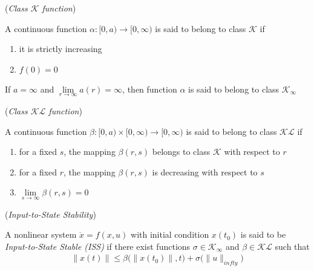 \begin{bw_box}
\begin{definition}\cite{khalil_nonlinear_systems} (\textit{Class $\mathcal{K}$ function})

  A continuous function $\alpha : [0, a) \to [0, \infty)$
  is said to belong to class $\mathcal{K}$ if
  \begin{enumerate}
    \item it is strictly increasing
    \item $f(0) = 0$
  \end{enumerate}
  If $a = \infty$ and $\lim\limits_{r \to \infty} a(r) = \infty$, then function
  $\alpha$ is said to belong to class $\mathcal{K}_{\infty}$
  \label{def:k_class}
\end{definition}
\end{bw_box}

\begin{bw_box}
\begin{definition}\cite{khalil_nonlinear_systems} (\textit{Class $\mathcal{KL}$ function})

  A continuous function $\beta : [0, a) \times [0, \infty) \to [0, \infty)$
  is said to belong to class $\mathcal{KL}$ if
  \begin{enumerate}
    \item for a fixed $s$, the mapping $\beta(r,s)$ belongs to class $\mathcal{K}$ with respect to $r$
    \item for a fixed $r$, the mapping $\beta(r,s)$ is decreasing with respect
      to $s$
    \item $\lim\limits_{s \to \infty} \beta(r,s) = 0$
  \end{enumerate}
  \label{def:kl_class}
\end{definition}
\end{bw_box}


\begin{bw_box}
\begin{definition}\cite{Sontag2008} (\textit{Input-to-State Stability})

  A nonlinear system $\dot{x} = f(x,u)$ with initial condition $x(t_0)$ is said
  to be \textit{Input-to-State Stable (ISS)} if there exist functions
  $\sigma \in \mathcal{K}_{\infty}$ and $\beta \in \mathcal{KL}$ such that
  \begin{align}
    \|x(t)\| \leq \beta\big(\|x(t_0)\|,t\big) + \sigma\big(\|u\|_{infty}\big)
  \end{align}
  \label{def:ISS}
\end{definition}
\end{bw_box}

